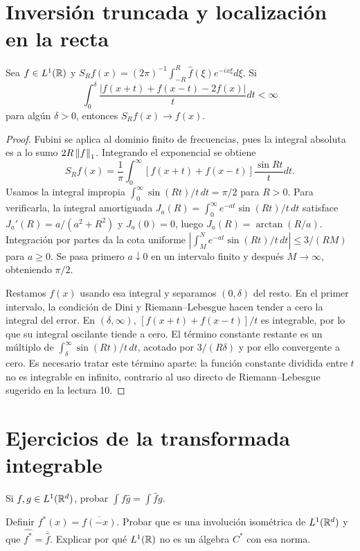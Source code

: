 \section{Inversión truncada y localización en la recta}
\begin{proposicion}\label{v4:dini-R}
Sea $f\in L^1(\mathbb R)$ y $S_Rf(x)=(2\pi)^{-1}\int_{-R}^R\widehat f(\xi)e^{-ix\xi}d\xi$. Si
\[
 \int_0^\delta\frac{|f(x+t)+f(x-t)-2f(x)|}{t}dt<\infty
\]
para algún $\delta>0$, entonces $S_Rf(x)\to f(x)$.
\end{proposicion}
\begin{proof}
Fubini se aplica al dominio finito de frecuencias, pues la integral absoluta es a lo sumo $2R\left\lVert f\right\rVert_1$. Integrando el exponencial se obtiene
\[
 S_Rf(x)=\frac1\pi\int_0^\infty[f(x+t)+f(x-t)]\frac{\sin Rt}{t}dt.
\]
Usamos la integral impropia $\int_0^\infty\sin(Rt)/t\,dt=\pi/2$ para $R>0$. Para verificarla, la integral amortiguada $J_a(R)=\int_0^\infty e^{-at}\sin(Rt)/t\,dt$ satisface $J_a'(R)=a/(a^2+R^2)$ y $J_a(0)=0$, luego $J_a(R)=\arctan(R/a)$. Integración por partes da la cota uniforme $|\int_M^Ne^{-at}\sin(Rt)/t\,dt|\leq3/(RM)$ para $a\geq0$. Se pasa primero $a\downarrow0$ en un intervalo finito y después $M\to\infty$, obteniendo $\pi/2$.

Restamos $f(x)$ usando esa integral y separamos $(0,\delta)$ del resto. En el primer intervalo, la condición de Dini y Riemann--Lebesgue hacen tender a cero la integral del error. En $(\delta,\infty)$, $[f(x+t)+f(x-t)]/t$ es integrable, por lo que su integral oscilante tiende a cero. El término constante restante es un múltiplo de $\int_\delta^\infty\sin(Rt)/t\,dt$, acotado por $3/(R\delta)$ y por ello convergente a cero. Es necesario tratar este término aparte: la función constante dividida entre $t$ no es integrable en infinito, contrario al uso directo de Riemann--Lebesgue sugerido en la lectura 10.
\end{proof}

\section{Ejercicios de la transformada integrable}
\begin{ejercicio}\label{ej:v4-l10-1}
Si $f,g\in L^1(\mathbb R^d)$, probar $\int f\widehat g=\int\widehat f g$.
\end{ejercicio}

\begin{ejercicio}\label{ej:v4-l10-2}
Definir $f^*(x)=\overline{f(-x)}$. Probar que es una involución isométrica de $L^1(\mathbb R^d)$ y que $\widehat{f^*}=\overline{\widehat f}$. Explicar por qué $L^1(\mathbb R)$ no es un álgebra $C^*$ con esa norma.
\end{ejercicio}

